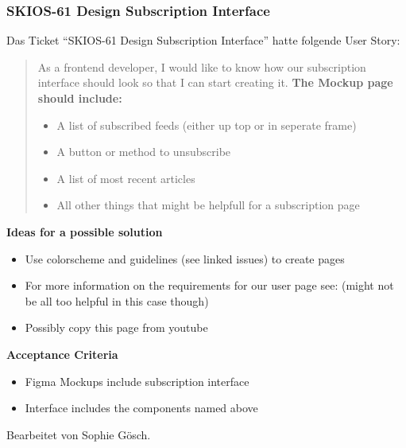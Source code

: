 \subsubsection{SKIOS-61 Design Subscription Interface}
Das Ticket \enquote{SKIOS-61 Design Subscription Interface} hatte folgende User Story:
\begin{quotation}
    As a frontend developer, I would like to know how our subscription interface should look so that I can start creating it.
    \textbf{The Mockup page should include:}
        \begin{itemize}
            \item A list of subscribed feeds (either up top or in seperate frame)
            \item A button or method to unsubscribe
            \item A list of most recent articles
            \item All other things that might be helpfull for a subscription page
        \end{itemize}
\end{quotation}
\textbf{Ideas for a possible solution}
    \begin{itemize}
        \item Use colorscheme and guidelines (see linked issues) to create pages
        \item For more information on the requirements for our user page see:  (might not be all too helpful in this case though)
        \item Possibly copy this page from youtube
    \end{itemize}
\textbf{Acceptance Criteria}
    \begin{itemize}
        \item Figma Mockups include subscription interface
        \item Interface includes the components named above
    \end{itemize}
Bearbeitet von Sophie Gösch.

